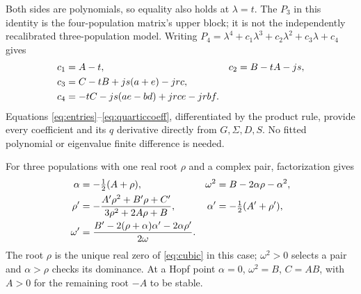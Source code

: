 \documentclass[11pt]{article}
\begin{document}
Both sides are polynomials, so equality also holds at $\lambda=t$.
The $P_3$ in this identity is the four-population matrix's upper block; it
is not the independently recalibrated three-population model.
Writing $P_4=\lambda^4+c_1\lambda^3+c_2\lambda^2+c_3\lambda+c_4$ gives
\begin{align}
 c_1&=A-t,&c_2&=B-tA-js,\notag\\
 c_3&=C-tB+js(a+e)-jrc,\notag\\
 c_4&=-tC-js(ae-bd)+jrce-jrbf. \label{eq:quarticcoeff}
\end{align}
Equations \eqref{eq:entries}--\eqref{eq:quarticcoeff}, differentiated by the
product rule, provide every coefficient and its $q$ derivative directly from
$G,\Sigma,D,S$. No fitted polynomial or eigenvalue finite difference is needed.

For three populations with one real root $\rho$ and a complex pair,
factorization gives
\begin{align}
 \alpha&=-\tfrac12(A+\rho),&
 \omega^2&=B-2\alpha\rho-\alpha^2,\notag\\
 \rho'&=-\frac{A'\rho^2+B'\rho+C'}{3\rho^2+2A\rho+B},&
 \alpha'&=-\tfrac12(A'+\rho'),\notag\\
 \omega'&=\frac{B'-2(\rho+\alpha)\alpha'-2\alpha\rho'}{2\omega}.
 \label{eq:cubicfrequency}
\end{align}
The root $\rho$ is the unique real zero of \eqref{eq:cubic} in this case;
$\omega^2>0$ selects a pair and $\alpha>\rho$ checks its dominance.
At a Hopf point $\alpha=0$, $\omega^2=B$, $C=AB$, with $A>0$ for the remaining
root $-A$ to be stable.

\newpage
\end{document}
